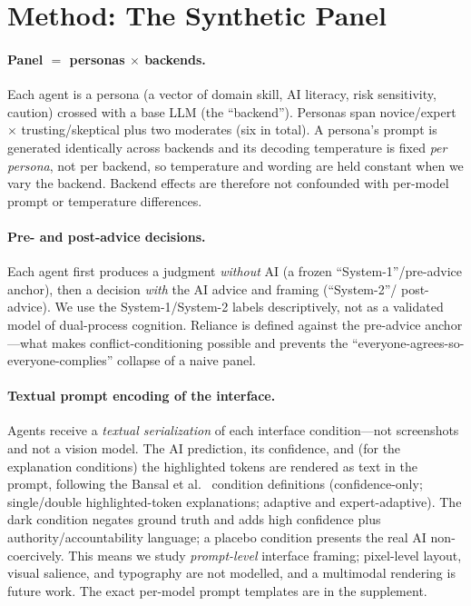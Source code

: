 \documentclass[manuscript,nonacm]{acmart}
\begin{document}
\section{Method: The Synthetic Panel}
\label{sec:method}

\paragraph{Panel $=$ personas $\times$ backends.} Each agent is a persona (a vector of domain skill, AI
literacy, risk sensitivity, caution) crossed with a base LLM (the ``backend''). Personas span
novice/expert $\times$ trusting/skeptical plus two moderates (six in total). A persona's prompt
is generated identically across backends and its decoding temperature is fixed \emph{per persona}, not per
backend, so temperature and wording are held constant when we vary the backend. Backend effects are
therefore not confounded with per-model prompt or temperature differences.

\paragraph{Pre- and post-advice decisions.} Each agent first produces a judgment \emph{without} AI (a
frozen ``System-1''/pre-advice anchor), then a decision \emph{with} the AI advice and framing (``System-2''/
post-advice). We use the System-1/System-2 labels descriptively, not as a validated model of dual-process
cognition. Reliance is defined against the pre-advice anchor---what makes conflict-conditioning possible and
prevents the ``everyone-agrees-so-everyone-complies'' collapse of a naive panel.

\paragraph{Textual prompt encoding of the interface.} Agents receive a \emph{textual serialization} of
each interface condition---not screenshots and not a vision model. The AI prediction, its confidence, and
(for the explanation conditions) the highlighted tokens are rendered as text in the prompt, following the
Bansal et al.~\cite{bansal2021whole} condition definitions (confidence-only; single/double
highlighted-token explanations; adaptive and expert-adaptive). The dark condition negates ground truth and
adds high confidence plus authority/accountability language; a placebo condition presents the real AI
non-coercively. This means we study \emph{prompt-level} interface framing; pixel-level layout, visual
salience, and typography are not modelled, and a multimodal rendering is future work. The exact per-model
prompt templates are in the supplement.
\end{document}
